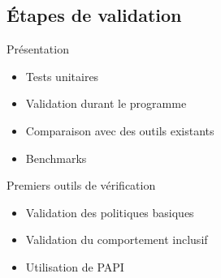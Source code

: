 \subsection{\'Etapes de validation}
\begin{frame}
  \begin{block}{Pr\'esentation}
    \begin{itemize}
      \item Tests unitaires
      \item Validation durant le programme
      \item Comparaison avec des outils existants
      \item Benchmarks
    \end{itemize}
  \end{block}
  \begin{block}{Premiers outils de v\'erification}
    \begin{itemize}
      \item Validation des politiques basiques
      \item Validation du comportement inclusif
      \item Utilisation de \textsf{PAPI}
    \end{itemize}
  \end{block}
\end{frame}

